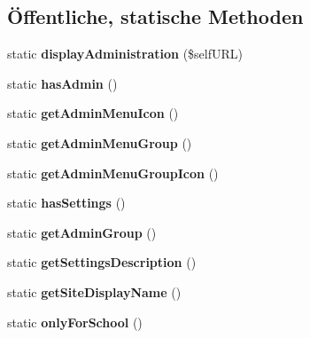 \subsection*{Öffentliche, statische Methoden}
\begin{DoxyCompactItemize}
\item 
\mbox{\label{classoffice365info_a7d3c97c73aa06a45198ead474d589b81}} 
static {\bfseries display\+Administration} (\$self\+U\+RL)
\item 
\mbox{\label{classoffice365info_a8050cd802e1af0aea2e53c233612680f}} 
static {\bfseries has\+Admin} ()
\item 
\mbox{\label{classoffice365info_a1f889e56d1fecae914ec1c3b35b1ca0e}} 
static {\bfseries get\+Admin\+Menu\+Icon} ()
\item 
\mbox{\label{classoffice365info_a0daff4e41e328cb5b844523ed48bcf87}} 
static {\bfseries get\+Admin\+Menu\+Group} ()
\item 
\mbox{\label{classoffice365info_a32d1a10d334f6b4fb50ad25449e63f83}} 
static {\bfseries get\+Admin\+Menu\+Group\+Icon} ()
\item 
\mbox{\label{classoffice365info_a9b7e36dee529893bddc853714ea8f30d}} 
static {\bfseries has\+Settings} ()
\item 
\mbox{\label{classoffice365info_a7dc191498d469975b2bb37af818b88db}} 
static {\bfseries get\+Admin\+Group} ()
\item 
\mbox{\label{classoffice365info_adbc694e157bf6a1c929abc4247c0001c}} 
static {\bfseries get\+Settings\+Description} ()
\item 
\mbox{\label{classoffice365info_a7f2e64c4a19f2af4f8dce0003fc05b6f}} 
static {\bfseries get\+Site\+Display\+Name} ()
\item 
\mbox{\label{classoffice365info_a60b3c97f7a4826d525b7eb8ee428e161}} 
static {\bfseries only\+For\+School} ()
\end{DoxyCompactItemize}

